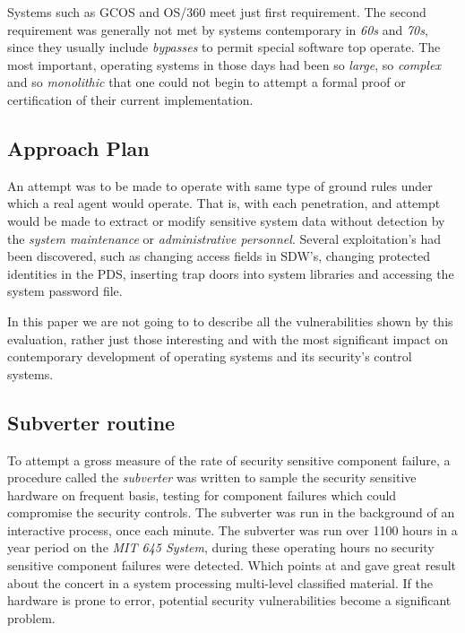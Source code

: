 Systems such as GCOS and OS/360 meet just first requirement. The second requirement was generally not met by
systems contemporary in \textit{60s} and \textit{70s}, since they usually include \textit{bypasses} to permit
special software top operate.
The most important, operating systems in those days had been so \textit{large}, so \textit{complex} and 
so \textit{monolithic} that one could not begin to attempt a formal proof or certification of their current 
implementation. 

\subsection{Approach Plan}

An attempt was to be made to operate with same type of ground rules under which a real agent would operate.
That is, with each penetration, and attempt would be made to extract or modify sensitive system data 
without detection by the \textit{system maintenance} or \textit{administrative personnel}.
Several exploitation's had been discovered, such as changing access fields in SDW's, changing protected 
identities in the PDS, inserting trap doors into system libraries and accessing the system password file.

In this paper we are not going to to describe all the vulnerabilities shown by this evaluation, rather just those 
interesting and with the most significant impact on contemporary development of operating systems and its 
security's control systems.


\subsection{Subverter routine}

To attempt a gross measure of the rate of security sensitive component failure, a procedure called the 
\textit{subverter} was written to sample the security sensitive hardware on frequent basis, testing for 
component failures which could compromise the security controls.
The subverter was run in the background of an interactive process, once each minute. The subverter was run 
over 1100 hours in a year period on the \textit{MIT 645 System}, during these operating hours no security sensitive 
component failures were detected.
Which points at and gave great result about the concert in a system processing multi-level classified material.
If the hardware is prone to error, potential security vulnerabilities become a significant problem.

